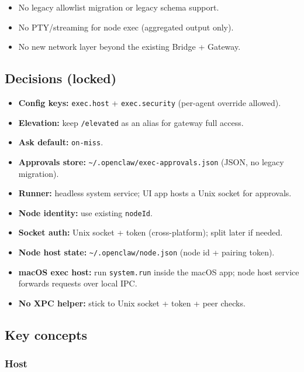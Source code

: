 \begin{itemize}
  \item No legacy allowlist migration or legacy schema support.
  \item No PTY/streaming for node exec (aggregated output only).
  \item No new network layer beyond the existing Bridge + Gateway.
\end{itemize}


\subsection{Decisions (locked)}


\begin{itemize}
  \item \textbf{Config keys:} \texttt{exec.host} + \texttt{exec.security} (per-agent override allowed).
  \item \textbf{Elevation:} keep \texttt{/elevated} as an alias for gateway full access.
  \item \textbf{Ask default:} \texttt{on-miss}.
  \item \textbf{Approvals store:} \texttt{\textasciitilde{}/.openclaw/exec-approvals.json} (JSON, no legacy migration).
  \item \textbf{Runner:} headless system service; UI app hosts a Unix socket for approvals.
  \item \textbf{Node identity:} use existing \texttt{nodeId}.
  \item \textbf{Socket auth:} Unix socket + token (cross-platform); split later if needed.
  \item \textbf{Node host state:} \texttt{\textasciitilde{}/.openclaw/node.json} (node id + pairing token).
  \item \textbf{macOS exec host:} run \texttt{system.run} inside the macOS app; node host service forwards requests over local IPC.
  \item \textbf{No XPC helper:} stick to Unix socket + token + peer checks.
\end{itemize}


\subsection{Key concepts}


\subsubsection{Host}


